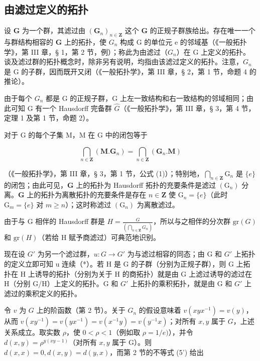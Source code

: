 \subsection{由滤过定义的拓扑}

设 \(\mathbf{G}\) 为一个群，其滤过由 \((\mathbf{G}_n)_{n\in \mathbf{Z}}\) 这个 \(\mathbf{G}\) 的正规子群族给出。存在唯一一个与群结构相容的 \(\mathbf{G}\) 上的拓扑，使 \(G_{n}\) 构成 G 的单位元 e 的邻域基（《一般拓扑学》，第 III 章，§ 1，第 2 节，例）；称此为由滤过（\(G_{n}\)）在 G 上定义的拓扑。谈及滤过群的拓扑概念时，除非另有说明，均指由该滤过定义的拓扑。注意，\(G_{n}\) 是 G 的子群，因而既开又闭（《一般拓扑学》，第 III 章，§ 2，第 1 节，命题 4 的推论）。

由于每个 \(G_{n}\) 都是 G 的正规子群，G 上左一致结构和右一致结构的邻域相同；由此可知 G 有一个 Hausdorff 完备群 \(\hat{G}\)（《一般拓扑学》，第 III 章，§ 3，第 4 节，定理 1 及第 1 节，命题 2）。

对于 G 的每个子集 M，M 在 G 中的闭包等于

\[
\bigcap_ {n \in \mathbf {Z}} (\mathbf {M}. \mathbf {G} _ {n}) = \bigcap_ {n \in \mathbf {Z}} (\mathbf {G} _ {n}. \mathbf {M})
\]

	（《一般拓扑学》，第 III 章，§ 3，第 1 节，公式 (1)）；特别地，\(\bigcap_{n\in\mathbf{Z}}\mathrm{G}_{n}\) 是 \(\{e\}\) 的闭包；由此可见，\(\mathbf{G}\) 上的拓扑为 Hausdorff 拓扑的充要条件是滤过 \((\mathrm{G}_{n})\) 分离。\(\mathbf{G}\) 上的拓扑为离散拓扑的充要条件是存在 \(n\in\mathbf{Z}\) 使 \(\mathrm{G}_{n}=\{e\}\)（此时 \(\mathrm{G}_{m}=\{e\}\) 对 \(m\geqslant n\)）；这时称滤过 \((\mathrm{G}_{n})\) 为离散滤过。

由于与 G 相伴的 Hausdorff 群是 \(H = \frac{G}{\left(\bigcap_{n \in \mathbf{Z}} G_n\right)}\)，所以与之相伴的分次群 \(\text{gr}(G)\) 和 \(\text{gr}(H)\)（若给 H 赋予商滤过）可典范地识别。

现在设 \(G'\) 为另一个滤过群，\(u: G \to G'\) 为与滤过相容的同态；由 G 和 \(G'\) 上拓扑的定义立即可知 u 连续（*）。若 H 是 G 的子群（分别为正规子群），则 G 上拓扑在 H 上诱导的拓扑（分别为关于 H 的商拓扑）就是由 G 上滤过诱导的滤过在 H（分别 G/H）上定义的拓扑。G 和 \(G'\) 上拓扑的乘积拓扑，就是由 G 和 \(G'\) 上滤过的乘积定义的拓扑。

	令 \(v\) 为 \(G\) 上的阶函数（第 2 节）。关于 \(G_n\) 的假设意味着 \(v(xyx^{-1}) = v(y)\)，从而 \(v(xy^{-1}) = v(yx^{-1}) = v(x^{-1}y) = v(y^{-1}x)\)；对所有 \(x, y\) 属于 \(G\)，上述关系成立。取实数 \(\rho\)，使 \(0 < \rho < 1\)（例如取 \(\rho = 1 / e)\)），并令 \(d(x,y) = \rho^{y(xy - 1)}\)（对所有 \(x,y\) 属于 G）。则 \(d(x,x) = 0, d(x,y) = d(y,x)\)，而第 2 节的不等式 (5') 给出

